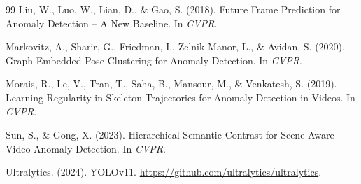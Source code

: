 \documentclass{article}
\begin{document}
\begin{thebibliography}{99}
Liu, W., Luo, W., Lian, D., \& Gao, S. (2018).
\newblock Future Frame Prediction for Anomaly Detection -- A New Baseline.
In {\em CVPR}.

Markovitz, A., Sharir, G., Friedman, I., Zelnik-Manor, L., \& Avidan, S. (2020).
\newblock Graph Embedded Pose Clustering for Anomaly Detection.
In {\em CVPR}.

Morais, R., Le, V., Tran, T., Saha, B., Mansour, M., \& Venkatesh, S. (2019).
\newblock Learning Regularity in Skeleton Trajectories for Anomaly Detection
in Videos.
In {\em CVPR}.

Sun, S., \& Gong, X. (2023).
\newblock Hierarchical Semantic Contrast for Scene-Aware Video Anomaly Detection.
In {\em CVPR}.

Ultralytics. (2024).
\newblock YOLOv11.
\newblock \url{https://github.com/ultralytics/ultralytics}.

\end{thebibliography}
\end{document}
